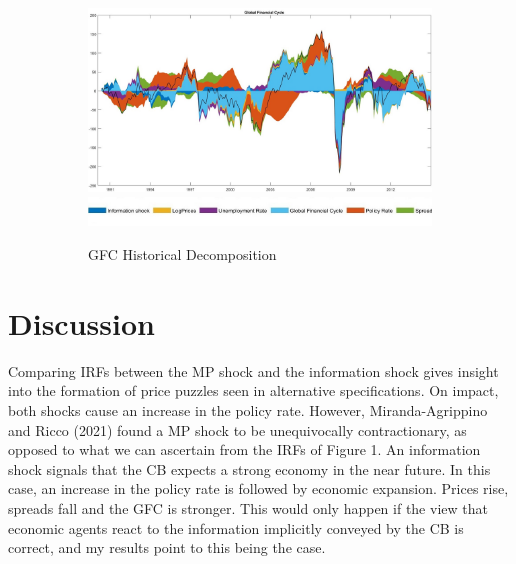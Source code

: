 \documentclass[11pt,a4paper]{article}
\begin{document}
\begin{figure}[hp]
        \vspace{0.2cm} %
        
        \begin{subfigure}{\textwidth}
            \centering
            \includegraphics[scale=.32]{Graphs/GFC_HD.jpg}
            \includegraphics*[scale=0.22]{Graphs/Inkedlegend.jpg}
            \captionsetup{font=scriptsize}
            \caption{GFC Historical Decomposition}
            \label{fig:GFChd}
        \end{subfigure}

        \caption{ }
        \label{fig:additional_elements}
    \end{figure}




\section{Discussion}


Comparing IRFs between the MP shock and the information shock gives insight into the formation of price puzzles seen in alternative specifications. 
On impact, both shocks cause an increase in the policy rate. However, Miranda-Agrippino and Ricco (2021) found a MP shock to be unequivocally contractionary, as opposed to what we can ascertain from the IRFs of Figure 1. 
An information shock signals that the CB expects a strong economy in the near future. In this case, an increase in the policy rate is followed by economic expansion. Prices rise, spreads fall and the GFC is stronger. 
This would only happen if the view that economic agents react to the information implicitly conveyed by the CB is correct, and my results point to this being the case.
    
\end{document}
